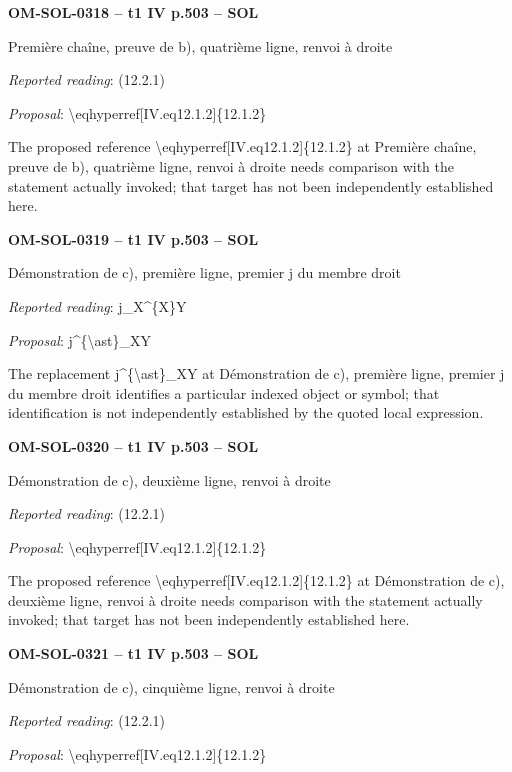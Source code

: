 \par\noindent\textbf{OM-SOL-0318 -- t1 IV p.503 -- SOL}\par
Première chaîne, preuve de b), quatrième ligne, renvoi à droite\par
\emph{Reported reading}: (12.2.1)\par
\emph{Proposal}: \textbackslash{}eqhyperref[IV.eq12.1.2]\{12.1.2\}\par
The proposed reference \textbackslash{}eqhyperref[IV.eq12.1.2]\{12.1.2\} at Première chaîne, preuve de b), quatrième ligne, renvoi à droite needs comparison with the statement actually invoked; that target has not been independently established here.\par
\par\noindent\textbf{OM-SOL-0319 -- t1 IV p.503 -- SOL}\par
Démonstration de c), première ligne, premier j du membre droit\par
\emph{Reported reading}: j\_X\textasciicircum{}\{X\}Y\par
\emph{Proposal}: j\textasciicircum{}\{\textbackslash{}ast\}\_XY\par
The replacement j\textasciicircum{}\{\textbackslash{}ast\}\_XY at Démonstration de c), première ligne, premier j du membre droit identifies a particular indexed object or symbol; that identification is not independently established by the quoted local expression.\par
\par\noindent\textbf{OM-SOL-0320 -- t1 IV p.503 -- SOL}\par
Démonstration de c), deuxième ligne, renvoi à droite\par
\emph{Reported reading}: (12.2.1)\par
\emph{Proposal}: \textbackslash{}eqhyperref[IV.eq12.1.2]\{12.1.2\}\par
The proposed reference \textbackslash{}eqhyperref[IV.eq12.1.2]\{12.1.2\} at Démonstration de c), deuxième ligne, renvoi à droite needs comparison with the statement actually invoked; that target has not been independently established here.\par
\par\noindent\textbf{OM-SOL-0321 -- t1 IV p.503 -- SOL}\par
Démonstration de c), cinquième ligne, renvoi à droite\par
\emph{Reported reading}: (12.2.1)\par
\emph{Proposal}: \textbackslash{}eqhyperref[IV.eq12.1.2]\{12.1.2\}\par
